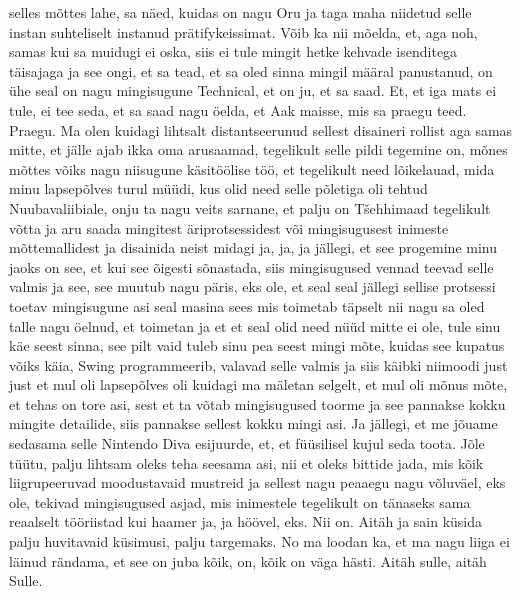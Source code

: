 selles mõttes lahe, sa näed, kuidas on nagu Oru ja taga maha niidetud selle instan suhteliselt instanud prätifykeissimat. Võib ka nii mõelda, et, aga noh, samas kui sa muidugi ei oska, siis ei tule mingit hetke kehvade isenditega täisajaga ja see ongi, et sa tead, et sa oled sinna mingil määral panustanud, on ühe seal on nagu mingisugune Technical, et on ju, et sa saad. Et, et iga mats ei tule, ei tee seda, et sa saad nagu öelda, et Aak maisse, mis sa praegu teed. Praegu.
Ma olen kuidagi lihtsalt distantseerunud sellest disaineri rollist aga samas mitte, et jälle ajab ikka oma arusaamad, tegelikult selle pildi tegemine on, mõnes mõttes võiks nagu niisugune käsitöölise töö, et tegelikult need lõikelauad, mida minu lapsepõlves turul müüdi, kus olid need selle põletiga oli tehtud Nuubavaliibiale, onju ta nagu veits sarnane, et palju on Tšehhimaad tegelikult võtta ja aru saada mingitest äriprotsessidest või mingisugusest inimeste mõttemallidest ja disainida neist midagi ja, ja, ja jällegi, et see progemine minu jaoks on see, et kui see õigesti sõnastada, siis mingisugused vennad teevad selle valmis ja see, see muutub nagu päris, eks ole, et seal seal jällegi sellise protsessi toetav mingisugune asi seal masina sees mis toimetab täpselt nii nagu sa oled talle nagu öelnud, et toimetan ja et et seal olid need nüüd mitte ei ole, tule sinu käe seest sinna, see pilt vaid tuleb sinu pea seest mingi mõte, kuidas see kupatus võiks käia, Swing programmeerib, valavad selle valmis ja siis käibki niimoodi just just et mul oli lapsepõlves oli kuidagi ma mäletan selgelt, et mul oli mõnus mõte, et tehas on tore asi, sest et ta võtab mingisugused toorme ja see pannakse kokku mingite detailide, siis pannakse sellest kokku mingi asi. Ja jällegi, et me jõuame sedasama selle Nintendo Diva esijuurde, et, et füüsilisel kujul seda toota. Jõle tüütu, palju lihtsam oleks teha seesama asi, nii et oleks bittide jada, mis kõik liigrupeeruvad moodustavaid mustreid ja sellest nagu peaaegu nagu võluväel, eks ole, tekivad mingisugused asjad, mis inimestele tegelikult on tänaseks sama reaalselt tööriistad kui haamer ja, ja höövel, eks.
Nii on.
Aitäh ja sain küsida palju huvitavaid küsimusi, palju targemaks. No ma loodan ka, et ma nagu liiga ei läinud rändama, et see on juba kõik, on, kõik on väga hästi.
Aitäh sulle, aitäh Sulle.
